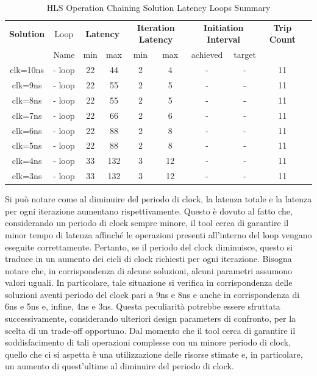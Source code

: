 \begin{table}[H]
    \centering
    \begin{tabular}{|c|c|c|c|c|c|c|c|c|c|}
        \hline
        \multicolumn{1}{|c|}{\textbf{Solution}} & \multicolumn{1}{|c|}{Loop} & \multicolumn{2}{|c|}{\textbf{Latency}} & \multicolumn{2}{c|}{\textbf{Iteration Latency}} & \multicolumn{2}{c|}{\textbf{Initiation Interval}} & \multicolumn{1}{c|}{\textbf{Trip Count}}  \\
        & Name & min & max & min & max & achieved & target &  \\
        \hline
        clk=10ns & - loop & 22 & 44 & 2 & 4 & - & - & 11 \\
        \hline
        clk=9ns & - loop & 22 & 55 & 2 & 5 & - & - & 11 \\
        \hline
        clk=8ns & - loop & 22 & 55 & 2 & 5 & - & - & 11 \\
        \hline
        clk=7ns & - loop & 22 & 66 & 2 & 6 & - & - & 11 \\
        \hline
        clk=6ns & - loop & 22 & 88 & 2 & 8 & - & - & 11 \\
        \hline
        clk=5ns & - loop & 22 & 88 & 2 & 8 & - & - & 11 \\
        \hline
        clk=4ns & - loop & 33 & 132 & 3 & 12 & - & - & 11 \\
        \hline
        clk=3ns & - loop & 33 & 132 & 3 & 12 & - & - & 11 \\
        \hline
    \end{tabular}
    \caption{HLS Operation Chaining Solution Latency Loops Summary }
    \label{tab:hls-operation-chaining-solution-loop-summary}
\end{table}
Si può notare come al diminuire del periodo di clock, la latenza totale e la latenza per ogni iterazione aumentano rispettivamente. Questo è dovuto al fatto che, considerando un periodo di clock sempre minore, il tool cerca di garantire il minor tempo di latenza affinché le operazioni presenti all'interno del loop vengano eseguite correttamente. Pertanto, se il periodo del clock diminuisce, questo si traduce in un aumento dei cicli di clock richiesti per ogni iterazione. Bisogna notare che, in corrispondenza di alcune soluzioni, alcuni parametri assumono valori uguali. In particolare, tale situazione si verifica in corrispondenza delle soluzioni aventi periodo del clock pari a 9ns e 8ns e anche in corrispondenza di 6ns e 5ns e, infine, 4ns e 3ns. Questa peculiarità potrebbe essere sfruttata successivamente, considerando ulteriori design parameters di confronto, per la scelta di un trade-off opportuno. Dal momento che il tool cerca di garantire il soddisfacimento di tali operazioni complesse con un minore periodo di clock, quello che ci si aspetta è una utilizzazione delle risorse stimate e, in particolare, un aumento di quest'ultime al diminuire del periodo di clock.
